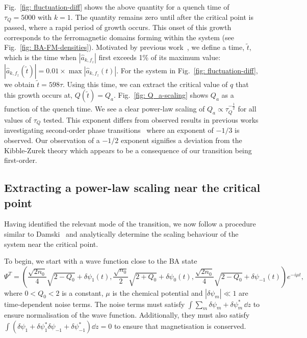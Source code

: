 Fig.~\ref{fig: fluctuation-diff} shows the above quantity for a quench time
of \(\tau_Q=5000\) with \(k=1\).
The quantity remains zero until after the critical point is passed, where
a rapid period of growth occurs.
This onset of this growth corresponds to the ferromagnetic domains forming
within the system (see Fig.~\ref{fig: BA-FM-densities}).
Motivated by previous work~\cite{Damski2007, Qiu2020}, we define a time,
\( \tilde{t} \), which is the time when \(|\hat{a}_{k, {f_z}}|\) first
exceeds 1\% of its maximum value: \(|\hat{a}_{k, {f_z}}(\tilde{t})| =
0.01\times \max|\hat{a}_{k, {f_z}}(t)|\).
For the system in Fig.~\ref{fig: fluctuation-diff}, we obtain
\(\tilde{t}=598\tau \).
Using this time, we can extract the critical value of \( q \) that this growth
occurs at, \(Q(\tilde{t}) = Q_a\).
Fig.~\ref{fig: Q_a-scaling} shows \(Q_a\) as a function of the quench time.
We see a clear power-law scaling of \(Q_a \propto \tau_Q^{-\frac{1}{2}}\) for
all values of \( \tau_Q \) tested.
This exponent differs from observed results in previous works investigating
second-order phase transitions~\cite{Damski2007, Anquez2016, Swislocki2013}
where an exponent of \(-1/3\) is observed.
Our observation of a \(-1/2\) exponent signifies a deviation from
the Kibble-Zurek theory which appears to be a consequence of our transition
being first-order.

\subsection{Extracting a power-law scaling near the critical point}
Having identified the relevant mode of the transition, we now follow a procedure
similar to Damski~\cite{Damski2007} and analytically determine the scaling
behaviour of the system near the critical point.

To begin, we start with a wave function close to the BA state
\begin{equation}\label{eq: spin-1-perturbed-BA-state}
    \Psi^T = \left(\frac{\sqrt{2n_0}}{4}\sqrt{2 - Q_0} + \delta\psi_{1}(t),
    \frac{\sqrt{n_0}}{2}\sqrt{2 + Q_0} + \delta \psi_0(t),
    \frac{\sqrt{2n_0}}{4}\sqrt{2 - Q_0} + \delta\psi_{-1}(t)\right)e^{-i\mu t},
\end{equation}
where \( 0 < Q_0 < 2 \) is a constant, \(\mu \) is the
chemical potential and \( |\delta\psi_m| \ll 1 \) are time-dependent noise
terms.
The noise terms must satisfy \(\int \sum_m\delta\psi_m+\delta\psi_m^* \, \dd z\)
to ensure normalisation of the wave function.
Additionally, they must also satisfy \(\int (\delta\psi_1 + \delta\psi_1^* 
\delta\psi_{-1} + \delta\psi_{-1}^*) \dd z = 0\) to ensure that magnetisation
is conserved.

